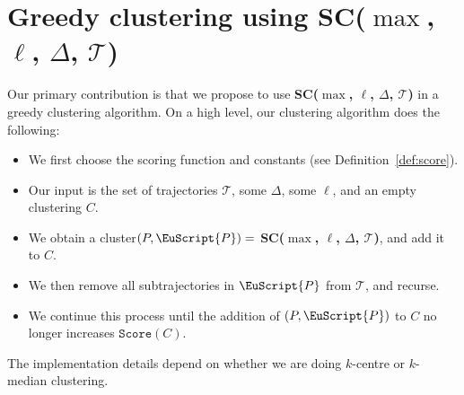 \documentclass[11pt]{article}
\newcommand{\fancy}[1]{\EuScript{#1}}
\newcommand{\pathlet}{cluster\xspace}
\begin{document}
\section{\texorpdfstring{Greedy clustering using SC($\max$, $\ell$, $\Delta$, $\mathcal{T}$)}{Greedy clustering using SC(max, l, D, T)}}
\label{sec:clustering}
%
Our primary contribution is that we propose to use \textbf{SC($\max$, $\ell$, $\Delta$, $\mathcal{T}$)} in a greedy clustering algorithm. 
On a high level, our clustering algorithm does the following:
%
\begin{itemize}
    \item We first choose the scoring function and constants (see Definition~\ref{def:score}).
    \item    Our input is the set of trajectories $\mathcal{T}$, some $\Delta$, some $\ell$, and an empty clustering $C$. 
    \item 
We obtain a \pathlet $(P, {\fancy{P}}) =$ \textbf{SC($\max$, $\ell$, $\Delta$, $\mathcal{T}$)}, and add it to $C$.
\item 
  We then remove all subtrajectories in ${\fancy{P}}$  from $\mathcal{T}$, and recurse. 
  \item 
We continue this process until the addition of $(P, {\fancy{P}})$ to $C$ no longer increases $\texttt{Score}(C)$.
\end{itemize}
%
%
\noindent
The implementation details depend on whether we are doing $k$-centre or $k$-median clustering. 
%
%
%
\end{document}
